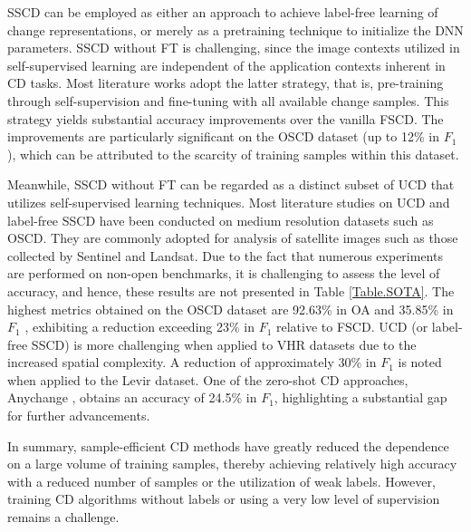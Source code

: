 SSCD can be employed as either an approach to achieve label-free learning of change representations, or merely as a pretraining technique to initialize the DNN parameters. SSCD without FT is challenging, since the image contexts utilized in self-supervised learning are independent of the application contexts inherent in CD tasks. Most literature works adopt the latter strategy, that is, pre-training through self-supervision and fine-tuning with all available change samples. This strategy yields substantial accuracy improvements over the vanilla FSCD. The improvements are particularly significant on the OSCD dataset (up to 12\% in $F_1$ \cite{qu2023tdsscd}), which can be attributed to the scarcity of training samples within this dataset. 

Meanwhile, SSCD without FT can be regarded as a distinct subset of UCD that utilizes self-supervised learning techniques. Most literature studies on UCD and label-free SSCD have been conducted on medium resolution datasets such as OSCD. They are commonly adopted for analysis of satellite images such as those collected by Sentinel and Landsat. Due to the fact that numerous experiments are performed on non-open benchmarks, it is challenging to assess the level of accuracy, and hence, these results are not presented in Table \ref{Table.SOTA}. The highest metrics obtained on the OSCD dataset are 92.63\% in OA and 35.85\% in $F_1$ \cite{Du2019Unsupervised}, exhibiting a reduction exceeding 23\% in $F_1$ relative to FSCD. UCD (or label-free SSCD) is more challenging when applied to VHR datasets due to the increased spatial complexity. A reduction of approximately 30\% in $F_1$ is noted when applied to the Levir dataset. One of the zero-shot CD approaches, Anychange \cite{zheng2024segment}, obtains an accuracy of 24.5\% in $F_1$, highlighting a substantial gap for further advancements.

In summary, sample-efficient CD methods have greatly reduced the dependence on a large volume of training samples, thereby achieving relatively high accuracy with a reduced number of samples or the utilization of weak labels. However, training CD algorithms without labels or using a very low level of supervision remains a challenge.
